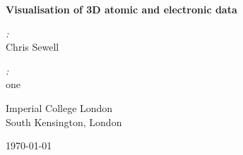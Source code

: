 \documentclass[10pt,parskip=half,
	toc=sectionentrywithdots,
	bibliography=totocnumbered,
	captions=tableheading,numbers=noendperiod]{scrartcl}
\begin{document}
		\begin{titlepage}

	\begin{center}

	\vspace*{1cm}

	\Huge\textbf{Visualisation of 3D atomic and electronic data}

	\vspace{0.5cm}

	\vspace{1.5cm}

	\begin{minipage}{0.8\textwidth}   
		\begin{center}  
		\begin{minipage}{0.39\textwidth}
		\begin{flushleft} \Large
		\emph{:}\\Chris Sewell\\
		\end{flushleft}
		\end{minipage}
		\hspace{\fill}
		\begin{minipage}{0.39\textwidth}
		\begin{flushright} \Large\emph{:} \\
			  one
		\end{flushright}
		\end{minipage}
		\end{center}   
	\end{minipage}

	\vfill

	\begin{minipage}{0.8\textwidth}
	\begin{center}
	\end{center} 
	\end{minipage}

	\vspace{0.8cm}
		  \LARGE{Imperial College London}\\
		  \LARGE{South Kensington, London}\\

	\vspace{0.4cm}

	\today

	\end{center}
	\end{titlepage}

		\begingroup
    \let\cleardoublepage\relax
    \let\clearpage\relax\tableofcontents\listoffigures\listoftables{}
    \endgroup
\end{document}
